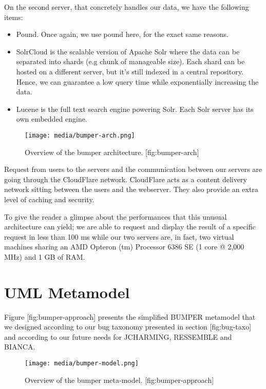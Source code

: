 On the second server, that concretely handles our data, we have the
following items:

\begin{itemize}
\item
  Pound. Once again, we use pound here, for the exact same reasons.
\item
  SolrCloud is the scalable version of Apache Solr where the data can be
  separated into shards (e.g chunk of manageable size). Each shard can
  be hosted on a different server, but it's still indexed in a central
  repository. Hence, we can guarantee a low query time while
  exponentially increasing the data.
\item
  Lucene is the full text search engine powering Solr. Each Solr server
  has its own embedded engine.
\end{itemize}

\begin{figure}[htbp]
\centering
\texttt{[image: media/bumper-arch.png]}
\caption{Overview of the bumper architecture. {[}fig:bumper-arch{]}}
\end{figure}

Request from users to the servers and the communication between our
servers are going through the CloudFlare network. CloudFlare acts as a
content delivery network sitting between the users and the webserver.
They also provide an extra level of caching and security.

To give the reader a glimpse about the performances that this unusual
architecture can yield; we are able to request and display the result of
a specific request in less than 100 ms while our two servers are, in
fact, two virtual machines sharing an AMD Opteron (tm) Processor 6386 SE
(1 core @ 2,000 MHz) and 1 GB of RAM.

\section{UML Metamodel}\label{uml-metamodel}

Figure {[}fig:bumper-approach{]} presents the simplified {BUMPER}
metamodel that we designed according to our bug taxonomy presented in
section {[}fig:bug-taxo{]} and according to our future needs for
{JCHARMING}, {RESSEMBLE} and {BIANCA}.

\begin{figure}[htbp]
\centering
\texttt{[image: media/bumper-model.png]}
\caption{Overview of the bumper meta-model. {[}fig:bumper-approach{]}}
\end{figure}

